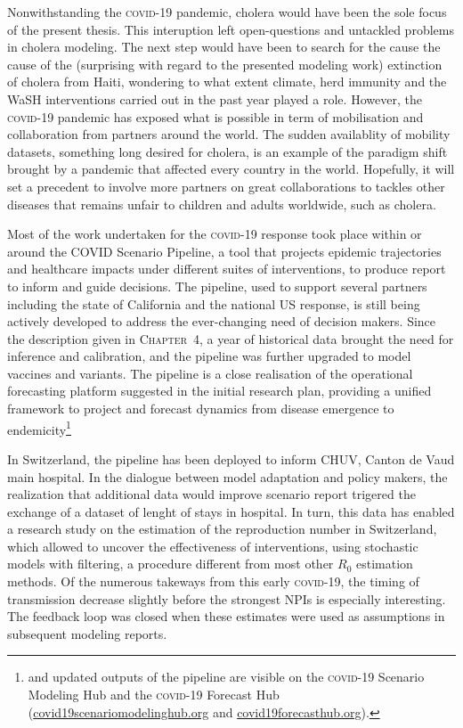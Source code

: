 Nonwithstanding the \textsc{covid}-19 pandemic, cholera would have been the sole focus of the present thesis. This interuption left open-questions and untackled problems in cholera modeling. The next step would have been to search for the cause the cause of the (surprising with regard to the presented modeling work) extinction of cholera from Haiti, wondering to what extent climate, herd immunity and the WaSH interventions carried out in the past year played a role. However, the \textsc{covid}-19 pandemic has exposed what is possible in term of mobilisation and collaboration from partners around the world. The sudden availablity of mobility datasets, something long desired for cholera, is an example of the paradigm shift brought by a pandemic that affected every country in the world. Hopefully, it will set a precedent to involve more partners on great collaborations to tackles other diseases that remains unfair to children and adults worldwide, such as cholera.

Most of the work undertaken for the \textsc{covid}-19 response took place within or around the COVID Scenario Pipeline, a tool that projects epidemic trajectories and healthcare impacts under different suites of interventions, to produce report to inform and guide decisions. The pipeline, used to support several partners including the state of California and the national US response, is still being actively developed to address the ever-changing need of decision makers. Since the description given in \textsc{Chapter~4}, a year of historical data brought the need for inference and calibration, and the pipeline was further upgraded to model vaccines and variants. The pipeline is a close realisation of the operational forecasting platform suggested in the initial research plan, providing a unified framework to project and forecast dynamics from disease emergence to endemicity\footnote{and updated outputs of the pipeline are visible on the \textsc{covid}-19 Scenario Modeling Hub and the \textsc{covid}-19 Forecast Hub (\url{covid19scenariomodelinghub.org} and \url{covid19forecasthub.org}).}

In Switzerland, the pipeline has been deployed to inform CHUV, Canton de Vaud main hospital. In the dialogue between model adaptation and policy makers, the realization that additional data would improve scenario report trigered the exchange of a dataset of lenght of stays in hospital. In turn, this data has enabled a research study on the estimation of the reproduction number in Switzerland, which allowed  to uncover the effectiveness of interventions, using stochastic models with filtering, a procedure different from most other $R_0$ estimation methods. Of the numerous takeways from this early \textsc{covid}-19, the timing of transmission decrease slightly before the strongest NPIs is especially interesting. The feedback loop was closed when these estimates were used as assumptions in subsequent modeling reports.

